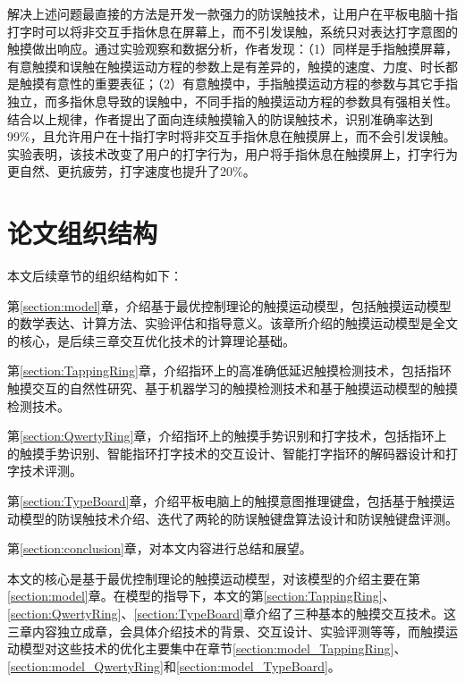 解决上述问题最直接的方法是开发一款强力的防误触技术，让用户在平板电脑十指打字时可以将非交互手指休息在屏幕上，而不引发误触，系统只对表达打字意图的触摸做出响应。通过实验观察和数据分析，作者发现：（1）同样是手指触摸屏幕，有意触摸和误触在触摸运动方程的参数上是有差异的，触摸的速度、力度、时长都是触摸有意性的重要表征；（2）有意触摸中，手指触摸运动方程的参数与其它手指独立，而多指休息导致的误触中，不同手指的触摸运动方程的参数具有强相关性。结合以上规律，作者提出了面向连续触摸输入的防误触技术，识别准确率达到99\%，且允许用户在十指打字时将非交互手指休息在触摸屏上，而不会引发误触。实验表明，该技术改变了用户的打字行为，用户将手指休息在触摸屏上，打字行为更自然、更抗疲劳，打字速度也提升了20\%。

\section{论文组织结构}

本文后续章节的组织结构如下：

第\ref{section:model}章，介绍基于最优控制理论的触摸运动模型，包括触摸运动模型的数学表达、计算方法、实验评估和指导意义。该章所介绍的触摸运动模型是全文的核心，是后续三章交互优化技术的计算理论基础。

第\ref{section:TappingRing}章，介绍指环上的高准确低延迟触摸检测技术，包括指环触摸交互的自然性研究、基于机器学习的触摸检测技术和基于触摸运动模型的触摸检测技术。

第\ref{section:QwertyRing}章，介绍指环上的触摸手势识别和打字技术，包括指环上的触摸手势识别、智能指环打字技术的交互设计、智能打字指环的解码器设计和打字技术评测。

第\ref{section:TypeBoard}章，介绍平板电脑上的触摸意图推理键盘，包括基于触摸运动模型的防误触技术介绍、迭代了两轮的防误触键盘算法设计和防误触键盘评测。

第\ref{section:conclusion}章，对本文内容进行总结和展望。

本文的核心是基于最优控制理论的触摸运动模型，对该模型的介绍主要在第\ref{section:model}章。在模型的指导下，本文的第\ref{section:TappingRing}、\ref{section:QwertyRing}、\ref{section:TypeBoard}章介绍了三种基本的触摸交互技术。这三章内容独立成章，会具体介绍技术的背景、交互设计、实验评测等等，而触摸运动模型对这些技术的优化主要集中在章节\ref{section:model_TappingRing}、\ref{section:model_QwertyRing}和\ref{section:model_TypeBoard}。
